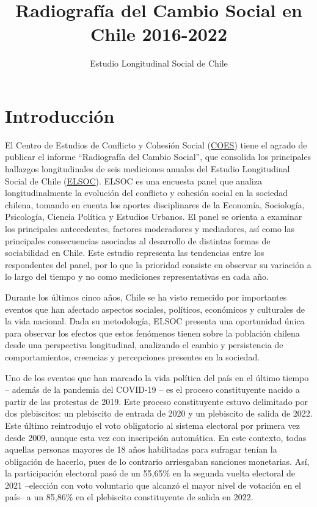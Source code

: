 \documentclass[
  12pt,
]{book}
\title{Radiografía del Cambio Social en Chile 2016-2022}
\subtitle{Estudio Longitudinal Social de Chile}
\author{}
\date{\vspace{-2.5em}}
\begin{document}
\maketitle

{
\hypersetup{linkcolor=}
\setcounter{tocdepth}{1}
\tableofcontents
}
\listoffigures
\listoftables
{}
\hypertarget{introducciuxf3n}{%
\chapter*{Introducción}\label{introducciuxf3n}}

El Centro de Estudios de Conflicto y Cohesión Social (\href{https://coes.cl/}{COES}) tiene el agrado de publicar el informe ``Radiografía del Cambio Social'', que consolida los principales hallazgos longitudinales de seis mediciones anuales del Estudio Longitudinal Social de Chile (\href{https://coes.cl/encuesta-panel/}{ELSOC}). ELSOC es una encuesta panel que analiza longitudinalmente la evolución del conflicto y cohesión social en la sociedad chilena, tomando en cuenta los aportes disciplinares de la Economía, Sociología, Psicología, Ciencia Política y Estudios Urbanos. El panel se orienta a examinar los principales antecedentes, factores moderadores y mediadores, así como las principales consecuencias asociadas al desarrollo de distintas formas de sociabilidad en Chile. Este estudio representa las tendencias entre los respondentes del panel, por lo que la prioridad consiste en observar su variación a lo largo del tiempo y no como mediciones representativas en cada año.

Durante los últimos cinco años, Chile se ha visto remecido por importantes eventos que han afectado aspectos sociales, políticos, económicos y culturales de la vida nacional. Dada su metodología, ELSOC presenta una oportunidad única para observar los efectos que estos fenómenos tienen sobre la población chilena desde una perspectiva longitudinal, analizando el cambio y persistencia de comportamientos, creencias y percepciones presentes en la sociedad.

Uno de los eventos que han marcado la vida política del país en el último tiempo -- además de la pandemia del COVID-19 -- es el proceso constituyente nacido a partir de las protestas de 2019. Este proceso constituyente estuvo delimitado por dos plebiscitos: un plebiscito de entrada de 2020 y un plebiscito de salida de 2022. Este último reintrodujo el voto obligatorio al sistema electoral por primera vez desde 2009, aunque esta vez con inscripción automática. En este contexto, todas aquellas personas mayores de 18 años habilitadas para sufragar tenían la obligación de hacerlo, pues de lo contrario arriesgaban sanciones monetarias. Así, la participación electoral pasó de un 55,65\% en la segunda vuelta electoral de 2021 --elección con voto voluntario que alcanzó el mayor nivel de votación en el país-- a un 85,86\% en el plebiscito constituyente de salida en 2022.
\end{document}
